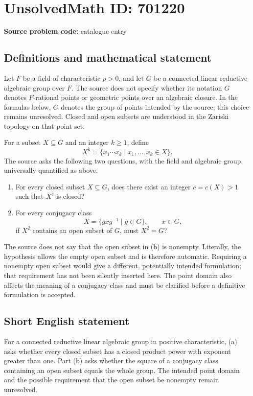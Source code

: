 \documentclass[11pt]{article}
\begin{document}
\section*{UnsolvedMath ID: 701220}
\textbf{Source problem code:} catalogue entry
\subsection{Definitions and mathematical statement}
Let \(F\) be a field of characteristic \(p>0\), and let \(G\) be a connected linear reductive algebraic group over \(F\). The source does not specify whether its notation \(G\) denotes \(F\)-rational points or geometric points over an algebraic closure. In the formulas below, \(G\) denotes the group of points intended by the source; this choice remains unresolved. Closed and open subsets are understood in the Zariski topology on that point set.

For a subset \(X\subseteq G\) and an integer \(k\geq 1\), define
\[
X^k=\{x_1\cdots x_k\mid x_1,\ldots,x_k\in X\}.
\]
The source asks the following two questions, with the field and algebraic group universally quantified as above.
\begin{enumerate}
\item[(a)] For every closed subset \(X\subseteq G\), does there exist an integer \(c=c(X)>1\) such that \(X^c\) is closed?
\item[(b)] For every conjugacy class
\[
X=\{gxg^{-1}\mid g\in G\},\qquad x\in G,
\]
if \(X^2\) contains an open subset of \(G\), must \(X^2=G\)?
\end{enumerate}
The source does not say that the open subset in (b) is nonempty. Literally, the hypothesis allows the empty open subset and is therefore automatic. Requiring a nonempty open subset would give a different, potentially intended formulation; that requirement has not been silently inserted here. The point domain also affects the meaning of a conjugacy class and must be clarified before a definitive formulation is accepted.
\subsection{Short English statement}
For a connected reductive linear algebraic group in positive characteristic, (a) asks whether every closed subset has a closed product power with exponent greater than one. Part (b) asks whether the square of a conjugacy class containing an open subset equals the whole group. The intended point domain and the possible requirement that the open subset be nonempty remain unresolved.
\end{document}
